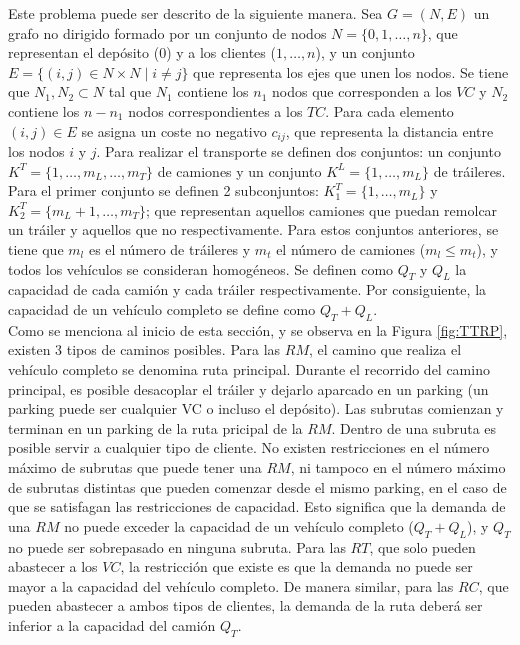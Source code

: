 Este problema puede ser descrito de la siguiente manera. Sea $G=(N,E)$ un grafo no dirigido formado por un conjunto de nodos $N=\{0,1,\ldots,n\}$, que representan el depósito ($0$) y a los clientes ($1,\ldots,n$), y un conjunto $E=\{(i,j)\in N\times N\;|\;i\neq j\}$ que representa los ejes que unen los nodos. Se tiene que $N_1, N_2\subset N$ tal que $N_1$ contiene los $n_1$ nodos que corresponden a los $VC$ y $N_2$ contiene los $n-n_1$ nodos correspondientes a los $TC$. Para cada elemento $(i,j)\in E$ se asigna un coste no negativo $c_{ij}$, que representa la distancia entre los nodos $i$ y $j$. Para realizar el transporte se definen dos conjuntos: un conjunto $K^T=\{1,\ldots,m_L,\ldots,m_T\}$ de camiones y un conjunto $K^L=\{1,\ldots,m_L\}$ de tráileres. Para el primer conjunto se definen 2 subconjuntos: $K^T_1=\{1,\ldots,m_L\}$ y $K_2^T=\{m_L+1,\ldots,m_T\}$; que representan aquellos camiones que puedan remolcar un tráiler y aquellos que no respectivamente. Para estos conjuntos anteriores, se tiene que $m_l$ es el número de tráileres y $m_t$ el número de camiones ($m_l\leq m_t$), y todos los vehículos se consideran homogéneos. Se definen como $Q_T$ y $Q_L$ la capacidad de cada camión y cada tráiler respectivamente. Por consiguiente, la capacidad de un vehículo completo se define como $Q_T+Q_L$.\\

Como se menciona al inicio de esta sección, y se observa en la Figura \ref{fig:TTRP}, existen 3 tipos de caminos posibles. Para las $RM$, el camino que realiza el vehículo completo se denomina ruta principal. Durante el recorrido del camino principal, es posible desacoplar el tráiler y dejarlo aparcado en un parking (un parking puede ser cualquier VC o incluso el depósito). Las subrutas comienzan y terminan en un parking de la ruta pricipal de la $RM$. Dentro de una subruta es posible servir a cualquier tipo de cliente. No existen restricciones en el número máximo de subrutas que puede tener una $RM$, ni tampoco en el número máximo de subrutas distintas que pueden comenzar desde el mismo parking, en el caso de que se satisfagan las restricciones de capacidad. Esto significa que la demanda de una $RM$ no puede exceder la capacidad de un vehículo completo ($Q_T+Q_L$), y $Q_T$ no puede ser sobrepasado en ninguna subruta. Para las $RT$, que solo pueden abastecer a los $VC$, la restricción que existe es que la demanda no puede ser mayor a la capacidad del vehículo completo. De manera similar, para las $RC$, que pueden abastecer a ambos tipos de clientes, la demanda de la ruta deberá ser inferior a la capacidad del camión $Q_T$.\\

